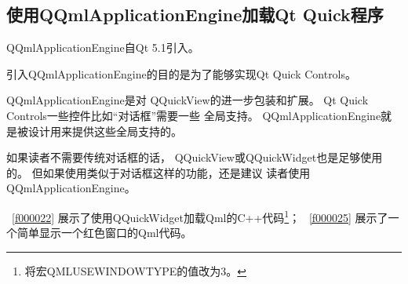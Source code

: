 \FloatBarrier
\subsection{
使用QQmlApplicationEngine加载Qt Quick程序
}\label{ss001210}


QQmlApplicationEngine自Qt 5.1引入。

引入QQmlApplicationEngine的目的是为了能够实现Qt Quick Controls。

QQmlApplicationEngine是对
QQuickView的进一步包装和扩展。
Qt Quick Controls一些控件比如“对话框”需要一些
全局支持。
QQmlApplicationEngine就是被设计用来提供这些全局支持的。

如果读者不需要传统对话框的话，
QQuickView或QQuickWidget也是足够使用的。
但如果使用类似于对话框这样的功能，还是建议
读者使用QQmlApplicationEngine。

\lstlistingname\ \ref{f000022}
展示了使用QQuickWidget加载Qml的C{\sourcefonttwo{}+}{\sourcefonttwo{}+}代码\footnote{
将宏QML\underline{\hspace{0.5em}}USE\underline{\hspace{0.5em}}WINDOW\underline{\hspace{0.5em}}TYPE的值改为3。
}；
\lstlistingname\ \ref{f000025}
展示了一个简单显示一个红色窗口的Qml代码。

